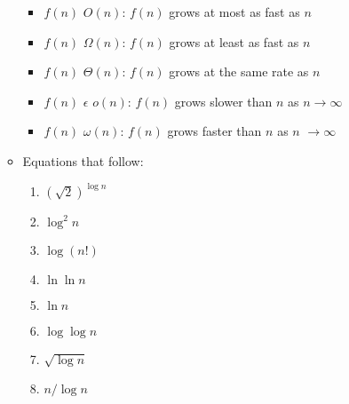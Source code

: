\documentclass{article}[12pt]
\newcommand\encircle[1]{\raisebox{.5pt}{\textcircled{\raisebox{-.9pt} {\footnotesize #1}}} }
\begin{document}
\begin{enumerate}[label=(\arabic*)]
\begin{itemize}
        \begin{itemize}
          \item $f(n)$ \epsilon $O(n)$: $f(n)$ grows at most as fast as $n$
          \item $f(n)$ \epsilon $\Omega(n)$: $f(n)$ grows at least as fast as $n$
          \item $f(n)$ \epsilon $\Theta(n)$: $f(n)$ grows at the same rate as $n$
          \item $f(n)$ $\epsilon$  $o(n)$: $f(n)$ grows slower than $n$ as $n \rightarrow \infty$
          \item $f(n)$ \epsilon $\omega(n)$: $f(n)$ grows faster than $n$ as $n$ $\rightarrow \infty$
        \end{itemize}
      \item Equations that follow:
\begin{center}
\begin{multicols}{4}
\begin{enumerate}[label=\encircle{\arabic*}]
  \item $(\sqrt{2})^{\log n}$
  \item $\log^2n$
  \item $\log(n!)$
  \item $\ln\ln n$
  \item $\ln n$
  \item $\log \log n$
  \item $\sqrt{\log n}$
  \item $n/\log n$
\end{enumerate}
\end{multicols}
\end{center}

    \end{itemize}


\end{enumerate}
\end{document}
